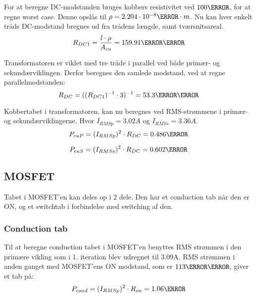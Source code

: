 For at beregne DC-modstanden bruges kobbers resistivitet ved $100\degreeCelsius$, for at regne worst case. Denne opslås til $\rho=2.204\cdot 10^{-8}\ohm \cdot m$. Nu kan hver enkelt tråds DC-modstand bregnes ud fra trådens længde, samt tværsnitsareal.
\begin{equation} \label{dc1-modstand}
R_{DC1} = \frac{l \cdot \rho}{A_{cu}} = 159.91\milli\ohm
\end{equation}

Transformatoren er viklet med tre tråde i parallel ved både primær- og sekundærviklingen. Derfor beregnes den samlede modstand, ved at regne parallelmodstanden:
\begin{equation} \label{dc-modstand}
R_{DC} = ((R_{DC1})^{-1} \cdot 3)^{-1} = 53.3\milli\ohm
\end{equation}

Kobbertabet i transformatoren, kan nu beregnes ved RMS-strømmene i primær- og sekundærviklingerne. Hvor $I_{RMSp} = 3.02A$ og $I_{RMSs} = 3.36A$.
\begin{equation} \label{dc-tab-pri}
P_{cuP} = (I_{RMSp})^2 \cdot R_{DC} = 0.486\watt
\end{equation}

\begin{equation} \label{dc-tab-sek}
P_{cuS} = (I_{RMSs})^2 \cdot R_{DC} = 0.602\watt
\end{equation}

\subsection{MOSFET}
Tabet i MOSFET'en kan deles op i 2 dele. Den har et conduction tab når den er ON, og et switchtab i forbindelse med switching af den.

\subsubsection{Conduction tab}
Til at beregne conduction tabet i MOSFET'en benyttes RMS strømmen i den primære vikling som i 1. iteration blev udregnet til 3.09A. RMS strømmen i anden ganget med MOSFET'ens ON modstand, som er $113\milli \ohm$, giver et tab på:
\begin{equation} \label{P_con}
P_{cond} = (I_{RMSp})^2 \cdot R_{on} = 1.06\watt
\end{equation}

